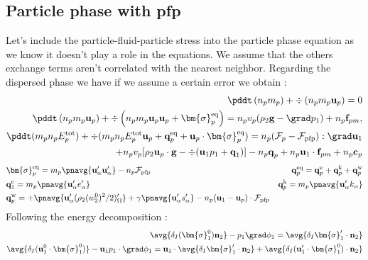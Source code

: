 \subsection*{Particle phase with pfp}

Let's include the particle-fluid-particle stress into the particle phase equation as we know it doesn't play a role in the equations. 
We assume that the others exchange terms aren't correlated with the nearest neighbor. 
Regarding the dispersed phase we have  if we assume a certain error we obtain :
\begin{align*}
    \pddt \left(n_p m_p\right)
    + \div \left(n_pm_p\textbf{u}_p
    \right)
    = 
    0\\
    \pddt \left(n_p m_p \textbf{u}_p\right)
    + \div \left(n_p
    m_p \textbf{u}_p \textbf{u}_p 
    + \bm{\sigma}_p^\text{eq}
    \right)
    = 
    n_p v_p (\rho_2 \textbf{g}
    - \grad p_1)
    + n_p \textbf{f}_{pm},\\
    \pddt(m_p n_pE_p^\text{tot})
    + \div(m_pn_p E_p^\text{tot} \textbf{u}_p 
    + \textbf{q}_p^\text{eq} 
    + \textbf{u}_p \cdot \bm{\sigma}_p^\text{eq})
    = n_p (\mathcal{F}_p -\mathcal{F}_\text{pfp}): \grad \textbf{u}_1 \\
    + n_p v_p [\rho_2 \textbf{u}_p\cdot  \textbf{g}
    - \div (\textbf{u}_1 p_1 + \textbf{q}_1)]
    -  n_p \textbf{q}_p
    +  n_p \textbf{u}_1 \cdot \textbf{f}_{pm}
    +  n_p \textbf{c}_p
\end{align*}
\begin{align*}
    &\bm{\sigma}_p^\text{eq}
    = m_p\pnavg{\textbf{u}_\alpha'\textbf{u}_\alpha'} 
    - n_p \mathcal{F}_\text{pfp} 
    &\textbf{q}_p^\text{eq}
    =\textbf{q}_p^\text{e} 
    +\textbf{q}_p^\text{k}  
    +\textbf{q}_p^\text{w}  
    \\
    &\textbf{q}_1^\text{e}
    = m_p \pnavg{\textbf{u}_\alpha' e_\alpha'} 
    &\textbf{q}_p^\text{k}
    = m_p \pnavg{\textbf{u}_\alpha' k_\alpha} 
    \\
    &\textbf{q}_p^\text{w}
    = 
    + \pnavg{\textbf{u}_\alpha'(\rho_2 (w^0_2)^2/2 )'_\Omega}
    + \gamma \pnavg{\textbf{u}_\alpha' s_\alpha'}
    - n_p (\textbf{u}_1 - \textbf{u}_p)\cdot \mathcal{F}_\text{pfp}
\end{align*}
Following the energy decomposition : 
\begin{align*}
    \avg{\delta_I (\bm{\sigma}_1^0 ) \textbf{n}_2} - p_1 \grad \phi_1
    = 
    \avg{\delta_I \bm{\sigma}_1'\cdot \textbf{n}_2}
    \\
    \avg{\delta_I (\textbf{u}_1^0 \cdot\bm{\sigma}_1^0 )} - \textbf{u}_1p_1\cdot \grad \phi_1
    = \textbf{u}_1 \cdot \avg{\delta_I \bm{\sigma}_1'\cdot \textbf{n}_2}
    + \avg{\delta_I (\textbf{u}_1' \cdot \bm{\sigma}_1^0 )\cdot \textbf{n}_2}
\end{align*}

